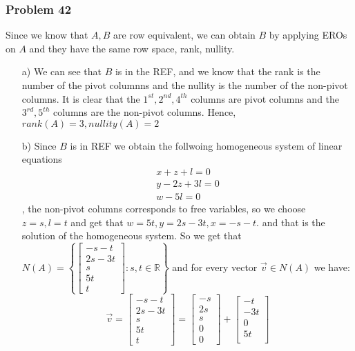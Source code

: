 \documentclass[a4paper,12pt]{article}
\begin{document}
\subsubsection*{Problem 42}
Since we know that $A,B$ are row equivalent, we can obtain $B$ by applying EROs on $A$ and they have the same row space, rank, nullity.
\begin{itemize}
  \item [a)] We can see that $B$ is in the REF, and we know that the rank is the number of the pivot columnns and the nullity is the number of the non-pivot columns. It is clear that the $1^{st},2^{nd},4^{th}$ columns are pivot columns and the $3^{rd},5^{th}$ columns are the non-pivot columns. Hence, $rank(A)=3, nullity(A)=2$
  \item [b)] Since $B$ is in REF we obtain the follwoing homogeneous system of linear equations 
  \begin{align*}
    x+z+l=0 \\ y-2z+3l=0\\ w-5l=0
  \end{align*}
  , the non-pivot columns corresponds to free variables, so we choose $z=s, l=t$ and get that $w=5t, y=2s-3t, x= -s-t.$ and that is the solution of the homogeneous system.
  So we get that $N(A)=\left\{
  \begin{bmatrix}
    -s-t \\
    2s-3t\\
    s \\
    5t\\
    t
  \end{bmatrix}: s,t \in \mathbb{R}
\right\}$
and for every vector $\vec{v} \in N(A)$ we have:
\[\vec{v}= \begin{bmatrix}
    -s-t \\
    2s-3t\\
    s \\
    5t\\
    t
  \end{bmatrix}=\begin{bmatrix}
    -s \\
    2s\\
    s \\
    0\\
    0
  \end{bmatrix}+\begin{bmatrix}
    -t \\
    -3t\\
     0\\
    5t\\

\end{bmatrix}\]
\end{itemize}
\end{document}
